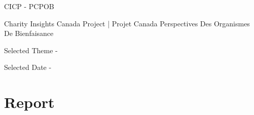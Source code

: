 \documentclass[a4paper]{article}
\begin{document}

\Large
\begin{center}
    CICP - PCPOB

    \Large
    Charity Insights Canada Project | Projet Canada Perspectives Des Organismes De Bienfaisance

    \hspace{10pt}

    \hspace{10pt}

    \normalsize
    Selected Theme - {}

    \normalsize
    Selected Date - {}
\end{center}

\hspace{10pt}   

\section{Report}


\begin{myfigurelist}
\end{myfigurelist}
\end{document}
